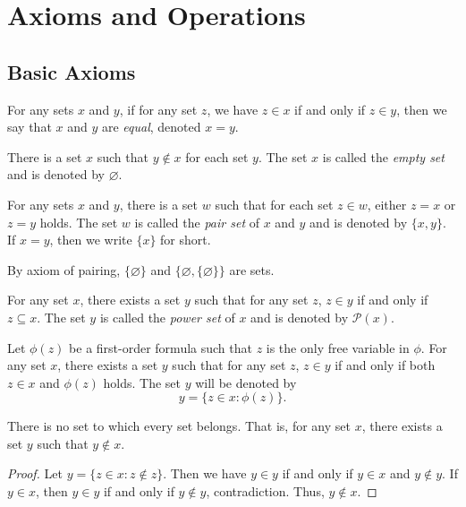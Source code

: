 \chapter{Axioms and Operations}
\section{Basic Axioms}
\begin{axiom}[Extensionality]
  For any sets $x$ and $y$, if for any set $z$, we have $z \in x$ if and only
  if $z \in y$, then we say that $x$ and $y$ are \emph{equal}, denoted $x = y$.
\end{axiom}

\begin{axiom}
  There is a set $x$ such that $y \notin x$ for each set $y$.
  The set $x$ is called the \emph{empty set} and is denoted by $\varnothing$.
\end{axiom}

\begin{axiom}[Pairing]
  For any sets $x$ and $y$, there is a set $w$ such that for each set
  $z \in w$, either $z = x$ or $z = y$ holds.
  The set $w$ is called the \emph{pair set} of $x$ and $y$ and is denoted by
  $\{x, y\}$.
  If $x = y$, then we write $\{x\}$ for short.
\end{axiom}

\begin{example}
  By axiom of pairing, $\{\varnothing\}$ and $\{\varnothing, \{\varnothing\}\}$
  are sets.
\end{example}

\begin{axiom}
  For any set $x$, there exists a set $y$ such that for any set $z$, $z \in y$
  if and only if $z \subseteq x$.
  The set $y$ is called the \emph{power set} of $x$ and is denoted by
  $\mathcal{P}(x)$.
\end{axiom}

\begin{axiom}[Subset]
  Let $\phi(z)$ be a first-order formula such that $z$ is the only free
  variable in $\phi$.
  For any set $x$, there exists a set $y$ such that for any set $z$, $z \in y$
  if and only if both $z \in x$ and $\phi(z)$ holds.
  The set $y$ will be denoted by
  \begin{equation*}
    y = \{z \in x: \phi(z)\}.
  \end{equation*}
\end{axiom}

\begin{theorem}
  There is no set to which every set belongs.
  That is, for any set $x$, there exists a set $y$ such that $y \notin x$.
\end{theorem}
\begin{proof}
  Let $y = \{z \in x: z \notin z\}$.
  Then we have $y \in y$ if and only if $y \in x$ and $y \notin y$.
  If $y \in x$, then $y \in y$ if and only if $y \notin y$, contradiction.
  Thus, $y \notin x$.
\end{proof}

